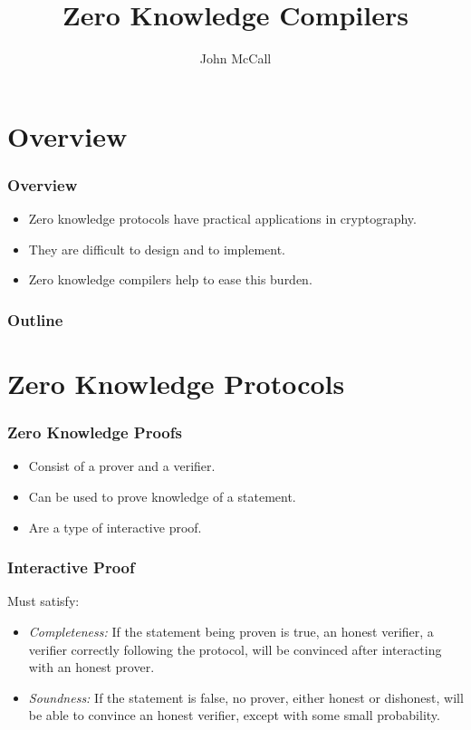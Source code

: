 \documentclass{beamer}
\title[Zero Knowledge Compilers]{Zero Knowledge Compilers}
\author[McCall]{John McCall}
\institute[U of Minn, Morris]
{
  Division of Science and Mathematics \\
  University of Minnesota, Morris \\
  Morris, Minnesota, USA
}
\begin{document}
\begin{frame}
	\titlepage
\end{frame}

\section*{Overview}

\begin{frame}
	\frametitle{Overview}
	\begin{itemize}
		\item Zero knowledge protocols have practical applications in cryptography.
		
		\item They are difficult to design and to implement.
		
		\item Zero knowledge compilers help to ease this burden.
	\end{itemize}
\end{frame}

\begin{frame}
	\frametitle{Outline}
	\tableofcontents[hideallsubsections]
\end{frame}

\section{Zero Knowledge Protocols}

\begin{frame}
	\frametitle{Zero Knowledge Proofs}
	\begin{itemize}
		\item Consist of a prover and a verifier.
		
		\item Can be used to prove knowledge of a statement.
		
		\item Are a type of interactive proof.
	\end{itemize}
\end{frame}

\begin{frame}
	\frametitle{Interactive Proof}
	Must satisfy:
	\begin{itemize}
		\item \textit{Completeness:} If the statement being proven is true, an
		honest verifier, a verifier correctly following the protocol, will be
		convinced after interacting with an honest prover.

		\item \textit{Soundness:} If the statement is false, no prover, either
		honest or dishonest, will be able to convince an honest verifier, except
		with some small probability.
	\end{itemize}
\end{frame}
\end{document}
